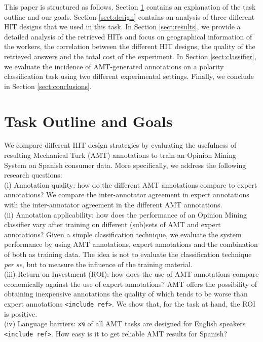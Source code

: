\documentclass[11pt,letterpaper]{article}
\begin{document}
This paper is structured as follows. Section \ref{sect:outline} contains an explanation of the task outline and our goals. Section \ref{sect:design} contains an analysis of three different HIT designs that we used in this task. In Section \ref{sect:results}, we provide a detailed analysis of the retrieved HITs and focus on geographical information of the workers, the correlation between the different HIT designs, the quality of the retrieved answers and the total cost of the experiment. In Section \ref{sect:classifier}, we evaluate the incidence of AMT-generated annotations on a polarity classification task using two different experimental settings. Finally, we conclude in Section \ref{sect:conclusions}.

\section{Task Outline and Goals}
\label{sect:outline}

We compare different HIT design strategies by evaluating the usefulness of resulting Mechanical Turk (AMT) annotations to train an Opinion Mining System on Spanish consumer data. More specifically, we address the following research questions:\\
 \indent (i) Annotation quality: how do the different AMT annotations compare to expert annotations? We compare the inter-annotator agreement in expert annotations with the inter-annotator agreement in the different AMT annotations.\\
 \indent (ii) Annotation applicability: how does the performance of an Opinion Mining classifier vary after training on different (sub)sets of AMT and expert annotations? Given a simple classification technique, we evaluate the system performance by using AMT annotations, expert annotations and the combination of both as training data. The idea is not to evaluate the classification technique \textit{per se}, but to measure the influence of the training material.\\
 \indent (iii) Return on Investment (ROI): how does the use of AMT annotations compare economically against the use of expert annotations? AMT offers the possibility of obtaining inexpensive annotations the quality of which tends to be worse than expert annotations \texttt{<include ref>}. We show that, for the task at hand, the ROI is positive.\\
 \indent (iv) Language barriers: \texttt{x\%} of all AMT tasks are designed for English speakers \texttt{<include ref>}. How easy is it to get reliable AMT results for Spanish? 
\end{document}
